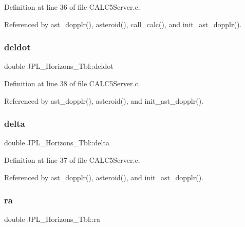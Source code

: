 Definition at line 36 of file C\+A\+L\+C5\+Server.\+c.



Referenced by ast\+\_\+dopplr(), asteroid(), call\+\_\+calc(), and init\+\_\+ast\+\_\+dopplr().

\mbox{\label{struct_j_p_l___horizons___tbl_af63b7627876452b4c30a07395822529b}} 
\subsubsection{\texorpdfstring{deldot}{deldot}}
{\footnotesize\ttfamily double J\+P\+L\+\_\+\+Horizons\+\_\+\+Tbl\+::deldot}



Definition at line 38 of file C\+A\+L\+C5\+Server.\+c.



Referenced by ast\+\_\+dopplr(), asteroid(), and init\+\_\+ast\+\_\+dopplr().

\mbox{\label{struct_j_p_l___horizons___tbl_a966b408063d870bfedf6ae7c6cccbd48}} 
\subsubsection{\texorpdfstring{delta}{delta}}
{\footnotesize\ttfamily double J\+P\+L\+\_\+\+Horizons\+\_\+\+Tbl\+::delta}



Definition at line 37 of file C\+A\+L\+C5\+Server.\+c.



Referenced by ast\+\_\+dopplr(), asteroid(), and init\+\_\+ast\+\_\+dopplr().

\mbox{\label{struct_j_p_l___horizons___tbl_abc262f3e856529b24a76210202778468}} 
\subsubsection{\texorpdfstring{ra}{ra}}
{\footnotesize\ttfamily double J\+P\+L\+\_\+\+Horizons\+\_\+\+Tbl\+::ra}



